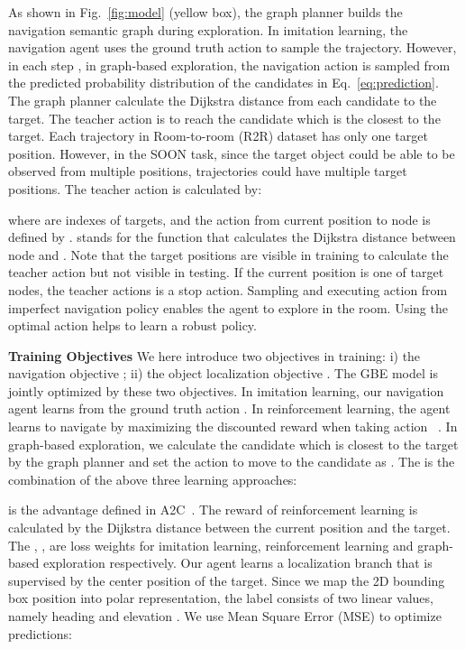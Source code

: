\documentclass[final]{cvpr}
\begin{document}
As shown in Fig.~\ref{fig:model} (yellow box), the graph planner builds the navigation semantic graph during exploration. 
In imitation learning, the navigation agent uses the ground truth action  to sample the trajectory. 
However, in each step , in graph-based exploration, the navigation action  is sampled from the predicted probability distribution of the candidates in Eq.~\ref{eq:prediction}. 
The graph planner calculate the Dijkstra distance from each candidate to the target. 
The teacher action  is to reach the candidate which is the closest to the target. 
Each trajectory in Room-to-room (R2R) dataset has only one target position. 
However, in the SOON task, since the target object could be able to be observed from multiple positions, trajectories could have multiple target positions. The teacher action  is calculated by:

where  are indexes of  targets, and the action from current position to node  is defined by .  stands for the function that calculates the Dijkstra distance between node  and . Note that the target positions are visible in training to calculate the teacher action but not visible in testing. If the current position is one of target nodes, the teacher actions  is a stop action. 
Sampling and executing action  from imperfect navigation policy enables the agent to explore in the room. 
Using the optimal action  helps to learn a robust policy. 



\noindent\textbf{Training Objectives} We here introduce two objectives in training: i) the navigation objective ; ii) the object localization objective . The GBE model is jointly optimized by these two objectives. 
In imitation learning, our navigation agent learns from the ground truth action . 
In reinforcement learning, the agent learns to navigate by maximizing the discounted reward when taking action ~\cite{sutton1999policy}. 
In graph-based exploration, we calculate the candidate which is closest to the target by the graph planner and set the action to move to the candidate as . 
The  is the combination of the above three learning approaches: 

 is the advantage defined in A2C~\cite{mnih2016asynchronous}. The reward of reinforcement learning is calculated by the Dijkstra distance between the current position and the target. 
The , ,  are loss weights for imitation learning, reinforcement learning and graph-based exploration respectively. 
Our agent learns a localization branch that is supervised by the center position of the target. Since we map the 2D bounding box position into polar representation, the label consists of two linear values, namely heading  and elevation . We use Mean Square Error (MSE) to optimize predictions: 
\end{document}
